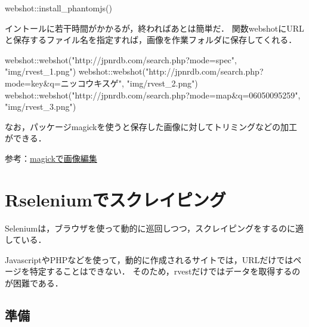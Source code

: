\documentclass[
]{article}
\newenvironment{Shaded}{\begin{snugshade}}{\end{snugshade}}
\newcommand{\FunctionTok}[1]{\textcolor[rgb]{0.00,0.00,0.00}{#1}}
\newcommand{\NormalTok}[1]{#1}
\newcommand{\SpecialCharTok}[1]{\textcolor[rgb]{0.00,0.00,0.00}{#1}}
\newcommand{\StringTok}[1]{\textcolor[rgb]{0.31,0.60,0.02}{#1}}
\begin{document}
\begin{Shaded}
\begin{Highlighting}[]
\NormalTok{webshot}\SpecialCharTok{::}\FunctionTok{install\_phantomjs}\NormalTok{()}
\end{Highlighting}
\end{Shaded}

イントールに若干時間がかかるが，終わればあとは簡単だ．
関数webshotにURLと保存するファイル名を指定すれば，画像を作業フォルダに保存してくれる．

\begin{Shaded}
\begin{Highlighting}[]
\NormalTok{webshot}\SpecialCharTok{::}\FunctionTok{webshot}\NormalTok{(}\StringTok{"http://jpnrdb.com/search.php?mode=spec"}\NormalTok{, }\StringTok{"img/rvest\_1.png"}\NormalTok{)}
\NormalTok{webshot}\SpecialCharTok{::}\FunctionTok{webshot}\NormalTok{(}\StringTok{"http://jpnrdb.com/search.php?mode=key\&q=ニッコウキスゲ"}\NormalTok{, }\StringTok{"img/rvest\_2.png"}\NormalTok{)}
\NormalTok{webshot}\SpecialCharTok{::}\FunctionTok{webshot}\NormalTok{(}\StringTok{"http://jpnrdb.com/search.php?mode=map\&q=06050095259"}\NormalTok{, }\StringTok{"img/rvest\_3.png"}\NormalTok{)}
\end{Highlighting}
\end{Shaded}

なお，パッケージmagickを使うと保存した画像に対してトリミングなどの加工ができる．

参考：\protect\hyperlink{magick}{magickで画像編集}

\hypertarget{rselenium}{%
\section{Rseleniumでスクレイピング}\label{rselenium}}

Seleniumは，ブラウザを使って動的に巡回しつつ，スクレイピングをするのに適している．

JavascriptやPHPなどを使って，動的に作成されるサイトでは，URLだけではページを特定することはできない．
そのため，rvestだけではデータを取得するのが困難である．

\hypertarget{ux6e96ux5099-10}{%
\subsection{準備}\label{ux6e96ux5099-10}}
\end{document}
